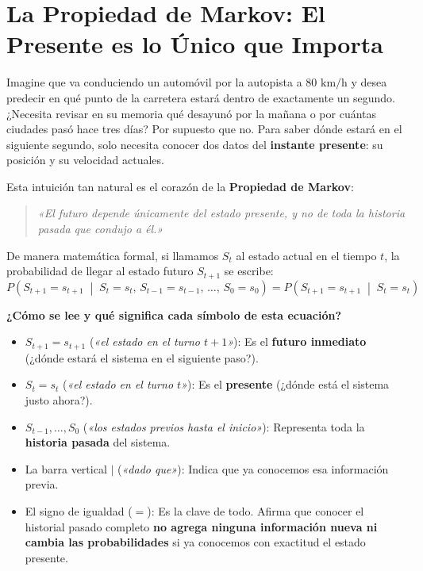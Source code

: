 \section{La Propiedad de Markov: El Presente es lo Único que Importa}
Imagine que va conduciendo un automóvil por la autopista a $80\text{ km/h}$ y desea predecir en qué punto de la carretera estará dentro de exactamente un segundo. ¿Necesita revisar en su memoria qué desayunó por la mañana o por cuántas ciudades pasó hace tres días? Por supuesto que no. Para saber dónde estará en el siguiente segundo, solo necesita conocer dos datos del \textbf{instante presente}: su posición y su velocidad actuales.

Esta intuición tan natural es el corazón de la \textbf{Propiedad de Markov}:
\begin{quote}
  \textit{«El futuro depende únicamente del estado presente, y no de toda la historia pasada que condujo a él.»}
\end{quote}

\noindent De manera matemática formal, si llamamos $S_t$ al estado actual en el tiempo $t$, la probabilidad de llegar al estado futuro $S_{t+1}$ se escribe:
\begin{equation}
  P\left( S_{t+1} = s_{t+1} \;\middle|\; S_t = s_t, \, S_{t-1} = s_{t-1}, \, \dots, \, S_0 = s_0 \right) = P\left( S_{t+1} = s_{t+1} \;\middle|\; S_t = s_t \right)
\end{equation}

\noindent \textbf{¿Cómo se lee y qué significa cada símbolo de esta ecuación?}
\begin{itemize}
  \item $S_{t+1} = s_{t+1}$ (\textit{«el estado en el turno $t+1$»}): Es el \textbf{futuro inmediato} (¿dónde estará el sistema en el siguiente paso?).
  \item $S_t = s_t$ (\textit{«el estado en el turno $t$»}): Es el \textbf{presente} (¿dónde está el sistema justo ahora?).
  \item $S_{t-1}, \dots, S_0$ (\textit{«los estados previos hasta el inicio»}): Representa toda la \textbf{historia pasada} del sistema.
  \item La barra vertical $\mid$ (\textit{«dado que»}): Indica que ya conocemos esa información previa.
  \item El signo de igualdad ($=$): Es la clave de todo. Afirma que conocer el historial pasado completo \textbf{no agrega ninguna información nueva ni cambia las probabilidades} si ya conocemos con exactitud el estado presente.
\end{itemize}

